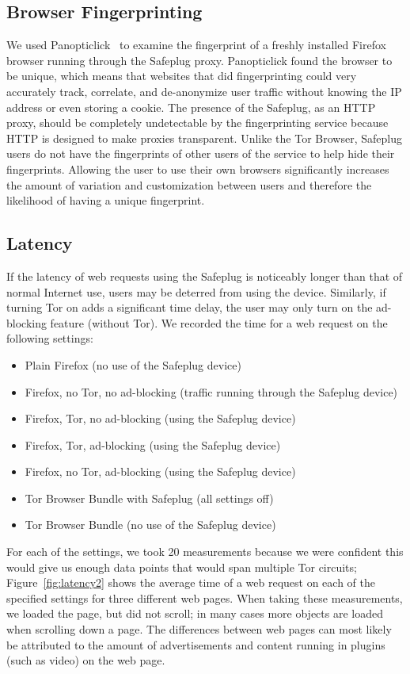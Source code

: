 \documentclass[letterpaper,twocolumn,10pt]{article}
\begin{document}
\subsection{Browser Fingerprinting}
We used Panopticlick~\cite{panopticlick} to examine the fingerprint of a freshly installed Firefox browser running through the Safeplug proxy.  Panopticlick found the browser to be unique, which means that websites that did fingerprinting could very accurately track, correlate, and de-anonymize user traffic without knowing the IP address or even storing a cookie.  The presence of the Safeplug, as an HTTP proxy, should be completely undetectable by the fingerprinting service because HTTP is designed to make proxies transparent.  Unlike the Tor Browser, Safeplug users do not have the fingerprints of other users of the service to help hide their fingerprints.  Allowing the user to use their own browsers significantly increases the amount of variation and customization between users and therefore the likelihood of having a unique fingerprint.

\subsection{Latency}
If the latency of web requests using the Safeplug is noticeably longer than that of normal Internet use, users may be deterred from using the device.  Similarly, if turning Tor on adds a significant time delay, the user may only turn on the ad-blocking feature (without Tor).  We recorded the time for a web request on the following settings:

\begin{itemize} %
\item Plain Firefox (no use of the Safeplug device)
\item Firefox, no Tor, no ad-blocking (traffic running through the Safeplug device)
\item Firefox, Tor, no ad-blocking (using the Safeplug device)
\item Firefox, Tor, ad-blocking (using the Safeplug device)
\item Firefox, no Tor, ad-blocking (using the Safeplug device)
\item Tor Browser Bundle with Safeplug (all settings off)
\item Tor Browser Bundle (no use of the Safeplug device)
\end{itemize}

For each of the settings, we took 20 measurements because we were confident this would give us enough data points that would span multiple Tor circuits; Figure~\ref{fig:latency2} shows the average time of a web request on each of the specified settings for three different web pages.  When taking these measurements, we loaded the page, but did not scroll; in many cases more objects are loaded when scrolling down a page.  The differences between web pages can most likely be attributed to the amount of advertisements and content running in plugins (such as video) on the web page.  
\end{document}
